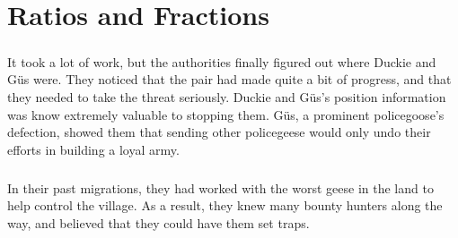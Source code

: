 \chapter{Ratios and Fractions}
\paragraph{} It took a lot of work, but the authorities finally figured out where Duckie and Güs were. They noticed that the pair had made quite a bit of progress, and that they needed to take the threat seriously. Duckie and Güs's position information was know extremely valuable to stopping them. Güs, a prominent policegoose's defection, showed them that sending other policegeese would only undo their efforts in building a loyal army.  
\paragraph{} In their past migrations, they had worked with the worst geese in the land to help control the village. As a result, they knew many bounty hunters along the way, and believed that they could have them set traps. 
